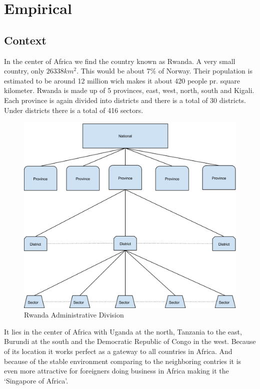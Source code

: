 \part{Empirical}
\chapter{Context}
In the center of Africa we find the country known as Rwanda. A very small country, only \(26338 km^2\). This would be about 7\% of Norway. 
Their population is estimated to be around 12 million wich makes it about 420 people pr. square kilometer. 
Rwanda is made up of 5 provinces, east, west, north, south and Kigali. 
Each province is again divided into districts and there is a total of 30 districts. Under districts there is a total of 416 sectors\cite{1}.
\begin{figure}
\centering
\includegraphics[width=12cm]{empirical/images/rwanda_administrative_division}
\caption{Rwanda Administrative Division}
\end{figure}
It lies in the center of Africa with Uganda at the north, Tanzania to the east, Burundi at the south and the Democratic Republic of Congo in the west. Because of its location it works perfect as a gateway to all countries in Africa. 
And because of the stable environment comparing to the neighboring contries it is even more attractive for foreigners doing business in Africa making it the `Singapore of Africa'.

